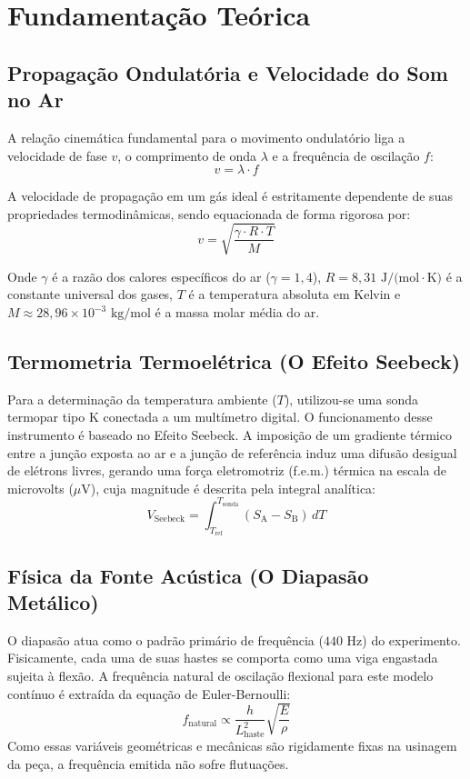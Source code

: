 \documentclass[12pt,a4paper]{article}
\begin{document}
\section{Fundamentação Teórica}
\subsection{Propagação Ondulatória e Velocidade do Som no Ar}
A relação cinemática fundamental para o movimento ondulatório liga a velocidade de fase $v$, o comprimento de onda $\lambda$ e a frequência de oscilação $f$:
\begin{equation}
    v = \lambda \cdot f
\end{equation}

A velocidade de propagação em um gás ideal é estritamente dependente de suas propriedades termodinâmicas, sendo equacionada de forma rigorosa por:
\begin{equation}
    v = \sqrt{\frac{\gamma \cdot R \cdot T}{M}}
\end{equation}

Onde $\gamma$ é a razão dos calores específicos do ar ($\gamma = 1,4$), $R = 8,31\text{ J/(mol}\cdot\text{K)}$ é a constante universal dos gases, $T$ é a temperatura absoluta em Kelvin e $M \approx 28,96 \times 10^{-3}\text{ kg/mol}$ é a massa molar média do ar. 

\subsection{Termometria Termoelétrica (O Efeito Seebeck)}
Para a determinação da temperatura ambiente ($T$), utilizou-se uma sonda termopar tipo K conectada a um multímetro digital. O funcionamento desse instrumento é baseado no Efeito Seebeck. A imposição de um gradiente térmico entre a junção exposta ao ar e a junção de referência induz uma difusão desigual de elétrons livres, gerando uma força eletromotriz (f.e.m.) térmica na escala de microvolts ($\mu\text{V}$), cuja magnitude é descrita pela integral analítica:
\begin{equation}
    V_{\text{Seebeck}} = \int_{T_{\text{ref}}}^{T_{\text{sonda}}} (S_{\text{A}} - S_{\text{B}})\, dT
\end{equation}

\subsection{Física da Fonte Acústica (O Diapasão Metálico)}
O diapasão atua como o padrão primário de frequência ($440\text{ Hz}$) do experimento. Fisicamente, cada uma de suas hastes se comporta como uma viga engastada sujeita à flexão. A frequência natural de oscilação flexional para este modelo contínuo é extraída da equação de Euler-Bernoulli:
\begin{equation}
    f_{\text{natural}} \propto \frac{h}{L_{\text{haste}}^2} \sqrt{\frac{E}{\rho}}
\end{equation}
Como essas variáveis geométricas e mecânicas são rigidamente fixas na usinagem da peça, a frequência emitida não sofre flutuações.
\end{document}
